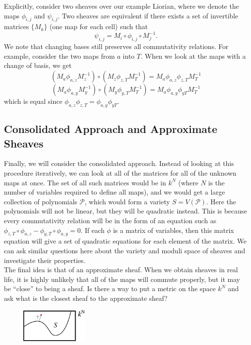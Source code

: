 \documentclass{article}
\newcommand{\cP}{\mathcal{P}}
\theoremstyle{definition}
\begin{document}
Explicitly, consider two sheaves over our example Liorian, where we denote the maps $\phi_{i,j}$ and $\psi_{i,j}$. Two sheaves are equivalent if there exists a set of invertible matrices $\{M_k\}$ (one map for each cell) such that
\begin{equation}
	\psi_{i,j} = M_i \circ \phi_{i,j}\circ M^{-1}_j.
\end{equation}
We note that changing bases still preserves all commutativity relations. For example, consider the two maps from $a$ into $T$. When we look at the maps with a change of basis, we get
\begin{equation}
	(M_a \phi_{a,z} M^{-1}_z) \circ (M_z \phi_{z,T} M^{-1}_T) = M_a \phi_{a,z} \phi_{z,T} M_T^{-1}
\end{equation}
\begin{equation}	
	(M_a \phi_{a,y} M^{-1}_y) \circ (M_y \phi_{y,T} M_T^{-1}) = M_a \phi_{a,y} \phi_{yT} M_T^{-1}
\end{equation}
which is equal since $\phi_{a,z} \phi_{z,T} = \phi_{a,y} \phi_{yT}$.

\subsection{Consolidated Approach and Approximate Sheaves}
Finally, we will consider the consolidated approach. Instead of looking at this procedure iteratively, we can look at all of the matrices for all of the unknown maps at once. The set of all such matrices would be in $k^N$ (where $N$ is the number of variables required to define all maps), and we would get a large collection of polynomials $\cP$, which would form a variety $S = V(\cP)$. Here the polynomials will not be linear, but they will be quadratic instead. This is because every commutativity relation will be in the form of an equation such as $\phi_{z,T} \circ \phi_{a,z} - \phi_{y,T} \circ \phi_{a,y}  = 0$. If each $\phi$ is a matrix of variables, then this matrix equation will give a set of quadratic equations for each element of the matrix. We can ask similar questions here about the variety and moduli space of sheaves and investigate their properties.\\

The final idea is that of an approximate sheaf. When we obtain sheaves in real life, it is highly unlikely that all of the maps will commute properly, but it may be ``close'' to being a sheaf. Is there a way to put a metric on the space $k^N$ and ask what is the closest sheaf to the approximate sheaf?

\begin{figure}[!htbp]
\centering
	\includegraphics[width=0.3\textwidth]{images/variety3.eps}
\end{figure}
\end{document}
